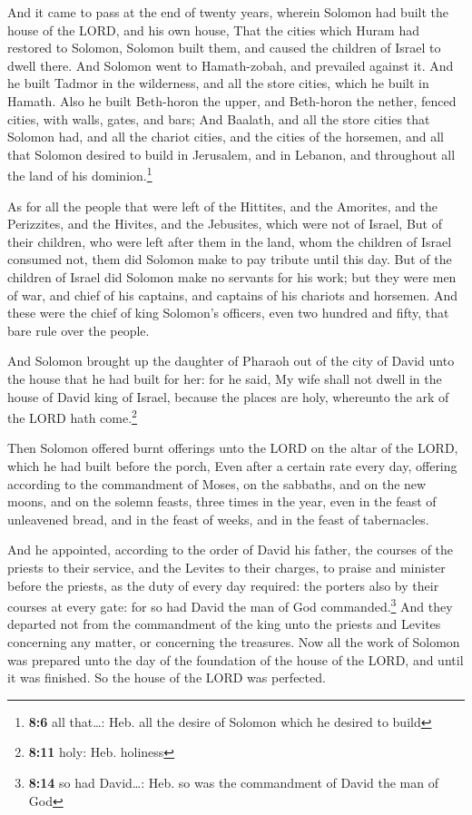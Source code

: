  And it came to pass at the end of twenty years, wherein
Solomon had built the house of the LORD, and his own house,
 That the cities which Huram had restored to Solomon,
Solomon built them, and caused the children of Israel to dwell there.
 And Solomon went to Hamath-zobah, and prevailed against
it.  And he built Tadmor in the wilderness, and all the
store cities, which he built in Hamath.  Also he built
Beth-horon the upper, and Beth-horon the nether, fenced cities, with
walls, gates, and bars;  And Baalath, and all the store
cities that Solomon had, and all the chariot cities, and the cities of
the horsemen, and all that Solomon desired to build in Jerusalem, and in
Lebanon, and throughout all the land of his dominion.\footnote{\textbf{8:6}
  all that\ldots: Heb. all the desire of Solomon which he desired to
  build}

 As for all the people that were left of the Hittites, and
the Amorites, and the Perizzites, and the Hivites, and the Jebusites,
which were not of Israel,  But of their children, who were
left after them in the land, whom the children of Israel consumed not,
them did Solomon make to pay tribute until this day.  But
of the children of Israel did Solomon make no servants for his work; but
they were men of war, and chief of his captains, and captains of his
chariots and horsemen.  And these were the chief of king
Solomon's officers, even two hundred and fifty, that bare rule over the
people.

 And Solomon brought up the daughter of Pharaoh out of
the city of David unto the house that he had built for her: for he said,
My wife shall not dwell in the house of David king of Israel, because
the places are holy, whereunto the ark of the LORD hath come.\footnote{\textbf{8:11}
  holy: Heb. holiness}

 Then Solomon offered burnt offerings unto the LORD on
the altar of the LORD, which he had built before the porch,
 Even after a certain rate every day, offering according
to the commandment of Moses, on the sabbaths, and on the new moons, and
on the solemn feasts, three times in the year, even in the feast of
unleavened bread, and in the feast of weeks, and in the feast of
tabernacles.

 And he appointed, according to the order of David his
father, the courses of the priests to their service, and the Levites to
their charges, to praise and minister before the priests, as the duty of
every day required: the porters also by their courses at every gate: for
so had David the man of God commanded.\footnote{\textbf{8:14} so had
  David\ldots: Heb. so was the commandment of David the man of God}
 And they departed not from the commandment of the king
unto the priests and Levites concerning any matter, or concerning the
treasures.  Now all the work of Solomon was prepared unto
the day of the foundation of the house of the LORD, and until it was
finished. So the house of the LORD was perfected.

